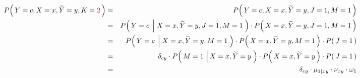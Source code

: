 \begin{enumerate}
\begin{eqnarray*}
P\!\left(\,Y=c,X=x,\widetilde{Y}=y,K={\color{red}2}\,\right)
&=&
	P\!\left(\,Y=c,X=x,\widetilde{Y}=y,J=1,M=1\,\right)
\\
&=&
	P\!\left(\,Y=c \;\left\vert\; X=x,\widetilde{Y}=y,J=1,M=1\right.\,\right)
	\cdot
	P\!\left(\,X=x,\widetilde{Y}=y,J=1,M=1\,\right)
\\
&=&
	P\!\left(\,Y=c \;\left\vert\; X=x,\widetilde{Y}=y,M=1\right.\,\right)
	\cdot
	P\!\left(\,X=x,\widetilde{Y}=y,M=1\,\right)
	\cdot
	P\!\left(\,J=1\,\right)
\\
&=&
	\delta_{cy}
	\cdot
	P\!\left(\,M=1 \,\left\vert\, X=x,\widetilde{Y}=y \right.\,\right) 
	\cdot
	P\!\left(\,X=x,\widetilde{Y}=y\,\right) 
	\cdot
	P\!\left(\,J=1\,\right)
\\
&=&
	\delta_{cy}
	\cdot
	\mu_{1 \vert xy} %
	\cdot
	\nu_{xy} %
	\cdot
	\omega_{1} %
\end{eqnarray*}


\end{enumerate}
